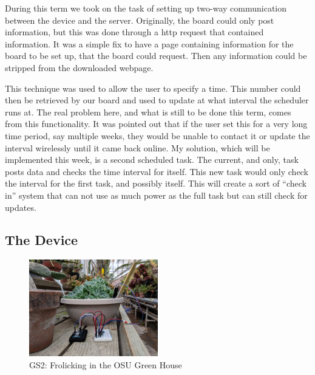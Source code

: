 \documentclass[IEEEtran,letterpaper,10pt,titlepage,fleqn,draftclsnofoot,onecolumn]{article}
\begin{document}
During this term we took on the task of setting up two-way communication between the device and the server. Originally, the board could only post information, but this was done through a http request that contained information. It was a simple fix to have a page containing information for the board to be set up, that the board could request. Then any information could be stripped from the downloaded webpage.

This technique was used to allow the user to specify a time. This number could then be retrieved by our board and used to update at what interval the scheduler runs at. The real problem here, and what is still to be done this term, comes from this functionality. It was pointed out that if the user set this for a very long time period, say multiple weeks, they would be unable to contact it or update the interval wirelessly until it came back online. My solution, which will be implemented this week, is a second scheduled task. The current, and only, task posts data and checks the time interval for itself. This new task would only check the interval for the first task, and possibly itself. This will create a sort of “check in” system that can not use as much power as the full task but can still check for updates.

\subsection{The Device}

\begin{figure}[H]
  \caption{GS2: Frolicking in the OSU Green House}
  \centering
  \includegraphics[width=0.5\textwidth]{green_house_testing}
\end{figure}
\end{document}

